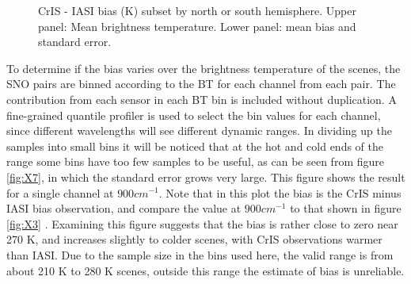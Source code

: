 \documentclass[twocolumn,10pt]{article}
\begin{document}
\begin{figure}[htb]
  \centering
\hfill
  \caption{CrIS - IASI bias (K) subset by north or south hemisphere. Upper panel: Mean brightness temperature. Lower panel: mean bias and standard error.}%
  \label{fig:X6}
\end{figure}

To determine if the bias varies over the brightness temperature of the scenes, the SNO pairs are binned according to the BT for each channel from each pair. The contribution from each sensor in each BT bin is included without duplication.  A fine-grained quantile profiler is used to select the bin values for each channel, since different wavelengths will see different dynamic ranges.  In dividing up the samples into small bins it will be noticed that at the hot and cold ends of the range some bins have too few samples to be useful, as can be seen from figure \ref{fig:X7}, in which the standard error grows very large. This figure shows the result for a single channel at $900 cm^{-1}$. Note that in this plot the bias is the CrIS minus IASI bias observation, and compare the value at \(900 cm^{-1}\) to that shown in figure \ref{fig:X3} . Examining this figure suggests that the bias is rather close to zero near 270 K, and increases slightly to colder scenes, with CrIS observations warmer than IASI. Due to the sample size in the bins used here, the valid range is from about 210 K to 280 K scenes, outside this range the estimate of bias is unreliable.
\end{document}
